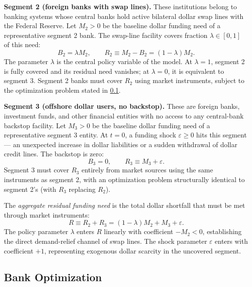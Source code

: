 \textbf{Segment 2 (foreign banks with swap lines).} These institutions belong to banking systems
whose central banks hold active bilateral dollar swap lines with the Federal Reserve. Let $M_2 > 0$
be the baseline dollar funding need of a representative segment 2 bank. The swap-line facility
covers fraction $\lambda \in [0,1]$ of this need:
\begin{equation}
  B_2 = \lambda M_2, \qquad R_2 \equiv M_2 - B_2 = (1-\lambda)M_2.
  \label{eq:seg2}
\end{equation}
The parameter $\lambda$ is the central policy variable of the model. At $\lambda = 1$, segment 2
is fully covered and its residual need vanishes; at $\lambda = 0$, it is equivalent to segment 3.
Segment 2 banks must cover $R_2$ using market instruments, subject to the optimization problem
stated in \cref{subsec:banks}.

\textbf{Segment 3 (offshore dollar users, no backstop).} These are foreign banks, investment
funds, and other financial entities with no access to any central-bank backstop facility. Let
$M_3 > 0$ be the baseline dollar funding need of a representative segment 3 entity. At $t=0$, a
funding shock $\varepsilon \geq 0$ hits this segment — an unexpected increase in dollar liabilities
or a sudden withdrawal of dollar credit lines. The backstop is zero:
\begin{equation}
  B_3 = 0, \qquad R_3 \equiv M_3 + \varepsilon.
  \label{eq:seg3}
\end{equation}
Segment 3 must cover $R_3$ entirely from market sources using the same instruments as segment 2,
with an optimization problem structurally identical to segment 2's (with $R_3$ replacing $R_2$).

The \textit{aggregate residual funding need} is the total dollar shortfall that must be met through
market instruments:
\begin{equation}
  R \equiv R_2 + R_3 = (1-\lambda)M_2 + M_3 + \varepsilon.
  \label{eq:R}
\end{equation}
The policy parameter $\lambda$ enters $R$ linearly with coefficient $-M_2 < 0$, establishing the
direct demand-relief channel of swap lines. The shock parameter $\varepsilon$ enters with
coefficient $+1$, representing exogenous dollar scarcity in the uncovered segment.

\subsection{Bank Optimization}
\label{subsec:banks}

